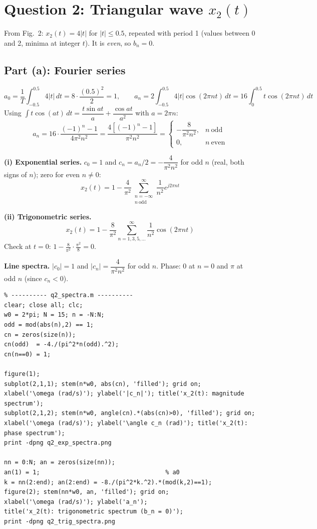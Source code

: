 \documentclass[11pt,a4paper]{article}
\begin{document}
\section{Question 2: Triangular wave $x_2(t)$}
From Fig.~2: $x_2(t)=4|t|$ for $|t|\le0.5$, repeated with period 1 (values between 0 and 2, minima at integer $t$). It is \emph{even}, so $b_n=0$.

\subsection{Part (a): Fourier series}
\[
a_0=\frac1T\int_{-0.5}^{0.5}4|t|\,dt = 8\cdot\frac{(0.5)^2}{2}=1,
\qquad
a_n=2\int_{-0.5}^{0.5}4|t|\cos(2\pi nt)\,dt=16\int_0^{0.5}t\cos(2\pi nt)\,dt
\]
Using $\int t\cos(at)\,dt=\dfrac{t\sin at}{a}+\dfrac{\cos at}{a^2}$ with $a=2\pi n$:
\[
a_n=16\cdot\frac{(-1)^n-1}{4\pi^2n^2}=\frac{4[(-1)^n-1]}{\pi^2n^2}
=\begin{cases}-\dfrac{8}{\pi^2n^2}, & n\ \text{odd}\\ 0, & n\ \text{even}\end{cases}
\]

\textbf{(i) Exponential series.} $c_0=1$ and $c_n=a_n/2=-\dfrac{4}{\pi^2n^2}$ for odd $n$ (real, both signs of $n$); zero for even $n\ne0$:
\[
x_2(t)=1-\frac{4}{\pi^2}\sum_{\substack{n=-\infty\\ n\ \text{odd}}}^{\infty}\frac{1}{n^2}e^{j2\pi nt}
\]

\textbf{(ii) Trigonometric series.}
\[
x_2(t)=1-\frac{8}{\pi^2}\sum_{n=1,3,5,\dots}^{\infty}\frac{1}{n^2}\cos(2\pi nt)
\]
Check at $t=0$: $1-\frac{8}{\pi^2}\cdot\frac{\pi^2}{8}=0$.

\textbf{Line spectra.} $|c_0|=1$ and $|c_n|=\dfrac{4}{\pi^2n^2}$ for odd $n$. Phase: $0$ at $n=0$ and $\pi$ at odd $n$ (since $c_n<0$).

\begin{lstlisting}
% ---------- q2_spectra.m ----------
clear; close all; clc;
w0 = 2*pi; N = 15; n = -N:N;
odd = mod(abs(n),2) == 1;
cn = zeros(size(n));
cn(odd)  = -4./(pi^2*n(odd).^2);
cn(n==0) = 1;

figure(1);
subplot(2,1,1); stem(n*w0, abs(cn), 'filled'); grid on;
xlabel('\omega (rad/s)'); ylabel('|c_n|'); title('x_2(t): magnitude spectrum');
subplot(2,1,2); stem(n*w0, angle(cn).*(abs(cn)>0), 'filled'); grid on;
xlabel('\omega (rad/s)'); ylabel('\angle c_n (rad)'); title('x_2(t): phase spectrum');
print -dpng q2_exp_spectra.png

nn = 0:N; an = zeros(size(nn));
an(1) = 1;                                   % a0
k = nn(2:end); an(2:end) = -8./(pi^2*k.^2).*(mod(k,2)==1);
figure(2); stem(nn*w0, an, 'filled'); grid on;
xlabel('\omega (rad/s)'); ylabel('a_n');
title('x_2(t): trigonometric spectrum (b_n = 0)');
print -dpng q2_trig_spectra.png
\end{lstlisting}
\end{document}
